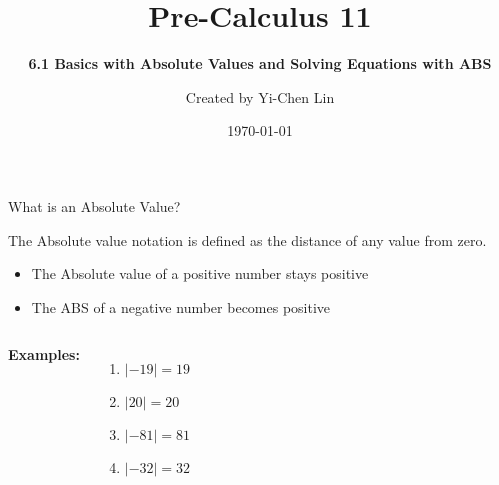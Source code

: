 \documentclass[aspectratio=169]{beamer}
\title{Pre-Calculus 11}
\subtitle{\textbf{6.1 Basics with Absolute Values and Solving Equations with ABS}}
\author{Created by Yi-Chen Lin}
\date{\today}
\begin{document}
\begin{frame}
    \titlepage
    \vfill
    \centering
    \footnotesize
\end{frame}

\begin{frame}{What is an Absolute Value?}
    \begin{tcolorbox}[colback=lightgray,colframe=primary,title=Definition]
        \footnotesize
        The Absolute value notation is defined as the distance of any value from zero.
        \begin{itemize}
            \item The Absolute value of a positive number stays positive
            \item The ABS of a negative number becomes positive
        \end{itemize}
    \end{tcolorbox}
    \vspace{0.5em}
    \begin{columns}[T,onlytextwidth]
        \scriptsize
        \textbf{Examples:}
        \begin{enumerate}[label=(\roman*)]
            \item $|-19| = 19$
            \item $|20| = 20$
            \item $|-81| = 81$
            \item $|-32| = 32$
        \end{enumerate}
    \end{columns}
\end{frame}
\end{document}
